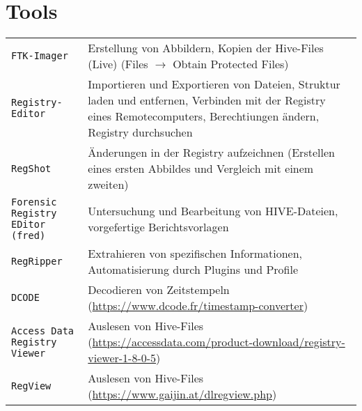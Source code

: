 \section{Tools}
\begin{tabular}{@{}p{\the\MyLen}%
		@{}p{\linewidth-\the\MyLen}@{}}
	\texttt{FTK-Imager} & Erstellung von Abbildern, Kopien der Hive-Files (Live) (Files $\rightarrow$ Obtain Protected Files)\\
	\texttt{Registry-Editor} & Importieren und Exportieren von Dateien, Struktur laden und entfernen, Verbinden mit der Registry eines Remotecomputers, Berechtiungen ändern, Registry durchsuchen\\
	\texttt{RegShot} & Änderungen in der Registry aufzeichnen (Erstellen eines ersten Abbildes und Vergleich mit einem zweiten)\\
	\texttt{Forensic Registry EDitor (fred)} & Untersuchung und Bearbeitung von HIVE-Dateien, vorgefertige Berichtsvorlagen\\
	\texttt{RegRipper} & Extrahieren von spezifischen Informationen, Automatisierung durch Plugins und Profile\\
	\texttt{DCODE} & Decodieren von Zeitstempeln (\url{https://www.dcode.fr/timestamp-converter})\\
	\texttt{Access Data Registry Viewer} & Auslesen von Hive-Files (\url{https://accessdata.com/product-download/registry-viewer-1-8-0-5})\\
	\texttt{RegView} & Auslesen von Hive-Files (\url{https://www.gaijin.at/dlregview.php})\\
\end{tabular}
